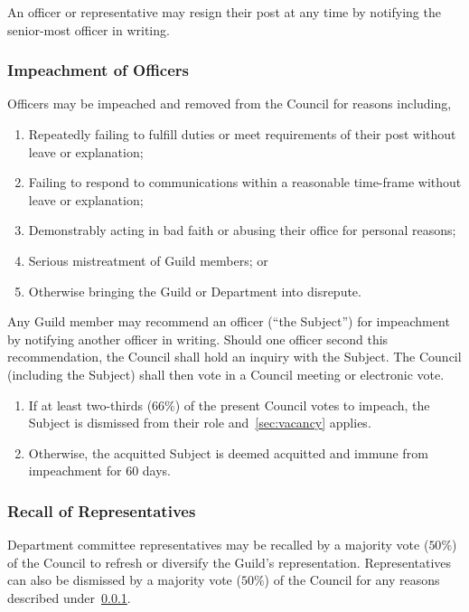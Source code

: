 An officer or representative may resign their post at any time by notifying the
senior-most officer in writing.

\subsubsection{Impeachment of Officers}\label{sec:impeachment}

Officers may be impeached and removed from the Council for reasons including,

\begin{enumerate}
      \item Repeatedly failing to fulfill duties or meet requirements of their post without
            leave or explanation;
      \item Failing to respond to communications within a reasonable time-frame without
            leave or explanation;
      \item Demonstrably acting in bad faith or abusing their office for personal reasons;
      \item Serious mistreatment of Guild members; or
      \item Otherwise bringing the Guild or Department into disrepute.
\end{enumerate}

Any Guild member may recommend an officer (``the Subject'') for impeachment by
notifying another officer in writing. Should one officer second this
recommendation, the Council shall hold an inquiry with the Subject. The Council
(including the Subject) shall then vote in a Council meeting or electronic
vote.

\begin{enumerate}
      \item If at least two-thirds ($66\%$) of the present Council votes to impeach, the
            Subject is dismissed from their role and~\ref{sec:vacancy} applies.
      \item Otherwise, the acquitted Subject is deemed acquitted and immune from
            impeachment for 60 days.
\end{enumerate}

\subsubsection{Recall of Representatives}\label{sec:recall}

Department committee representatives may be recalled by a majority vote
($50\%$) of the Council to refresh or diversify the Guild's representation.
Representatives can also be dismissed by a majority vote ($50\%$) of the
Council for any reasons described under~\ref{sec:impeachment}.

